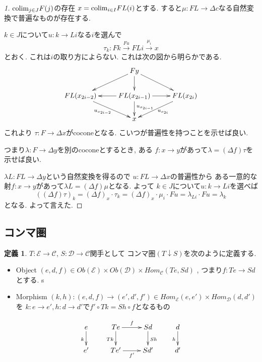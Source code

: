 \documentclass[dvipdfmx,a4paper,11pt]{article}
\newcommand{\colim}{{\rm colim}}
\theoremstyle{definition}
\newtheorem{dfn}[thm]{定義}
\begin{document}
\begin{proof}
[1]$\colim_{j \in J} F(j)$の存在
$x= \colim_{i\in I}FL(i)$とする.
すると$\mu : FL \to \Delta c$なる自然変換で普遍なものが存在する.

$k \in J$について$u : k \to Li$なる$i$を選んで
$$
\tau_k : Fk \overset{Fu}{\to} FLi \overset{\mu_{i}}{\to} x
$$
とおく. 
これは$i$の取り方によらない.
これは次の図から明らかである.
\begin{equation*}
\xymatrix@C=25pt@R=20pt{
& Fy\ar@{->}[ld]\ar@{->}[d]\ar@{->}[rd]
&
\\
FL(x_{2i-2})\ar@{->}[rd]_{u_{x_{2i-2}}}
&FL(x_{2i-1})\ar@{->}[l]\ar@{->}[r]\ar@{->}[d]^{u_{x_{2i-1}}}
&FL(x_{2i}) \ar@{->}[ld]^{u_{x_{2i}}}\\   
&x
& \\   
}
\end{equation*}
これより
$\tau : F \to \Delta x$がcoconeとなる.
こいつが普遍性を持つことを示せば良い.

つまり$\lambda : F \to \Delta y$を別のcoconeとするとき, ある
$f : x \to y$があって$\lambda = (\Delta f) \tau$を示せば良い.

$\lambda L : FL \to \Delta y$という自然変換を得るので
$u : FL \to \Delta x$の普遍性から
ある一意的な射$f : x \to y$があって$\lambda L = (\Delta f) \mu $となる.
よって
$k \in J$について$u : k \to Li$を選べば
$$
((\Delta f)\tau)_{k}
= 
(\Delta f)_{x}\cdot \tau_k
=
(\Delta f)_{x} \cdot \mu_{i} \cdot Fu
=\lambda_{Li}\cdot Fu
=\lambda _{k} 
$$
となる. 
よって言えた. 
\end{proof}


\subsection{コンマ圏}
 \begin{tcolorbox}
 [colback = white, colframe = green!35!black, fonttitle = \bfseries,breakable = true]
\begin{dfn}
$T :  \mathcal{E} \to \mathcal{C}$, $S : \mathcal{D} \to \mathcal{C}$関手として
コンマ圏$(T \downarrow S)$を次のように定義する. 
\begin{itemize}
\item Object $(e,d,f) \in Ob(\mathcal{E}) \times Ob(\mathcal{D}) \times Hom_{\mathcal{C}}(Te, Sd)$ , つまり$f : Te \to Sd$とする. s
\item Morphism $(k,h) : (e,d,f)  \to (e',d',f') \in Hom_{\mathcal{E}}(e,e') \times Hom_{\mathcal{D}}(d,d') $ を $k : e \to e', h: d \to d'$で$f' \circ Tk = Sh \circ f$となるもの
\end{itemize}

\begin{equation*}
\xymatrix@C=25pt@R=20pt{
e \ar@{->}[d] _{k}&Te\ar@{->}[d]_{Tk}  \ar@{->}[r]^{f} & Sd\ar@{->}[d]^{Sh} &d\ar@{->}[d]_{h}\\
e'&Te'\ar@{->}[r]_{f'} &Sd'&d' \\   
}
\end{equation*}
\end{dfn}
\end{tcolorbox}
\end{document}
